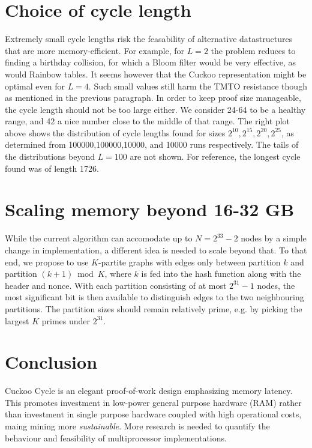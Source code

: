 \documentclass[11pt, oneside]{article}
\begin{document}
\section{Choice of cycle length}
Extremely small cycle lengths risk the feasability of alternative datastructures that
are more memory-efficient. For example, for $L=2$ the problem reduces to finding a birthday collision,
for which a Bloom filter would be very effective, as would Rainbow tables.
It seems however that the Cuckoo representation might be optimal even for $L=4$.
Such small values still harm the TMTO resistance though as mentioned in the previous paragraph.
In order to keep proof size manageable, the cycle length should not be too large either.
We consider 24-64 to be a healthy range, and 42 a nice number close to the middle of that range.
The right plot above shows the distribution of cycle lengths found for sizes $2^{10},2^{15},2^{20},2^{25}$,
as determined from 100000,100000,10000, and 10000 runs respectively. The tails of the distributions
beyond $L=100$ are not shown. For reference, the longest cycle found was of length 1726.

\section{Scaling memory beyond 16-32 GB}
While the current algorithm can accomodate up to $N=2^{33}-2$ nodes by a simple change
in implementation, a different idea is needed to scale beyond that.
To that end, we propose to use $K$-partite graphs with edges only between partition $k$ and partition $(k+1) \bmod K$,
where $k$ is fed into the hash function along with the header and nonce. With each partition consisting of at most
$2^31-1$ nodes, the most significant bit is then available to distinguish edges to the two neighbouring partitions.
The partition sizes should remain relatively prime, e.g. by picking the largest $K$ primes under $2^{31}$.

\section{Conclusion}
Cuckoo Cycle is an elegant proof-of-work design emphasizing memory latency.
This promotes investment in low-power general purpose hardware (RAM) rather than investment
in single purpose hardware coupled with high operational costs, maing mining more {\em sustainable}.
More research is needed to quantify the behaviour and feasibility of multiprocessor implementations.
\end{document}
